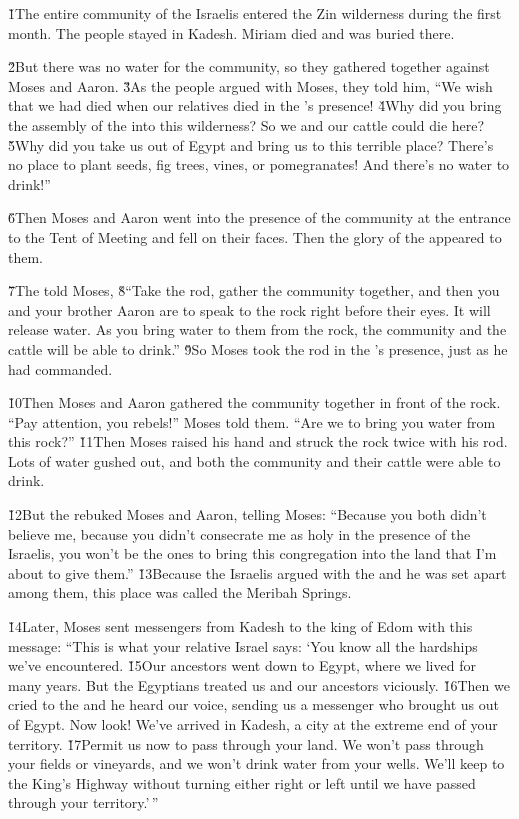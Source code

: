 \v{1}The entire community of the Israelis entered the Zin wilderness during the first month. The people stayed in Kadesh. Miriam died and was buried there.

\v{2}But there was no water for the community, so they gathered together against Moses and Aaron. \v{3}As the people argued with Moses, they told him, ``We wish that we had died when our relatives died in the 's presence! \v{4}Why did you bring the assembly of the  into this wilderness? So we and our cattle could die here? \v{5}Why did you take us out of Egypt and bring us to this terrible place? There's no place to plant seeds, fig trees, vines, or pomegranates! And there's no water to drink!''

\v{6}Then Moses and Aaron went into the presence of the community at the entrance to the Tent of Meeting and fell on their faces. Then the glory of the  appeared to them.

\v{7}The  told Moses, \v{8}``Take the rod, gather the community together, and then you and your brother Aaron are to speak to the rock right before their eyes. It will release water. As you bring water to them from the rock, the community and the cattle will be able to drink.'' \v{9}So Moses took the rod in the 's presence, just as he had commanded.

\v{10}Then Moses and Aaron gathered the community together in front of the rock. ``Pay attention, you rebels!'' Moses told them. ``Are we to bring you water from this rock?'' \v{11}Then Moses raised his hand and struck the rock twice with his rod. Lots of water gushed out, and both the community and their cattle were able to drink.

\v{12}But the  rebuked Moses and Aaron, telling Moses: ``Because you both didn't believe me, because you didn't consecrate me as holy in the presence of the Israelis, you won't be the ones to bring this congregation into the land that I'm about to give them.'' \v{13}Because the Israelis argued with the  and he was set apart among them, this place was called the Meribah Springs.

\v{14}Later, Moses sent messengers from Kadesh to the king of Edom with this message: ``This is what your relative Israel says: `You know all the hardships we've encountered. \v{15}Our ancestors went down to Egypt, where we lived for many years. But the Egyptians treated us and our ancestors viciously. \v{16}Then we cried to the  and he heard our voice, sending us a messenger who brought us out of Egypt. Now look! We've arrived in Kadesh, a city at the extreme end of your territory. \v{17}Permit us now to pass through your land. We won't pass through your fields or vineyards, and we won't drink water from your wells. We'll keep to the King's Highway without turning either right or left until we have passed through your territory.'\,''

